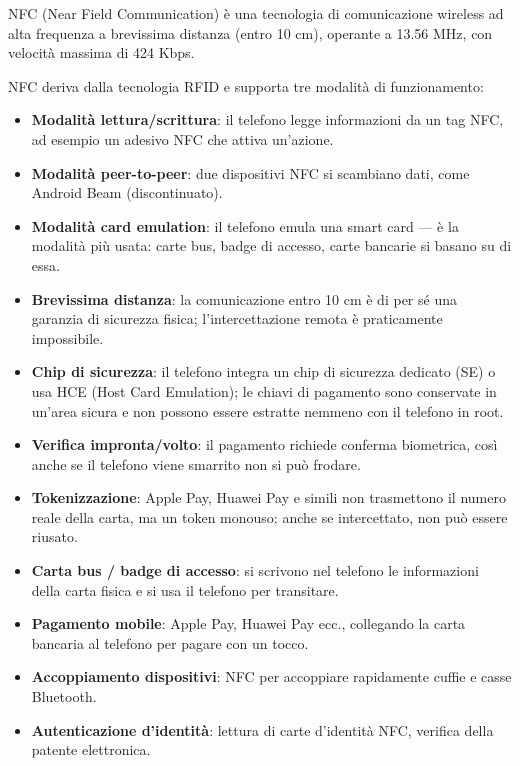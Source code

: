 
NFC (Near Field Communication) è una tecnologia di comunicazione wireless ad alta frequenza a brevissima distanza (entro 10 cm), operante a 13.56 MHz, con velocità massima di 424 Kbps.


NFC deriva dalla tecnologia RFID e supporta tre modalità di funzionamento:

\begin{itemize}
  \item \textbf{Modalità lettura/scrittura}: il telefono legge informazioni da un tag NFC, ad esempio un adesivo NFC che attiva un'azione.
  \item \textbf{Modalità peer-to-peer}: due dispositivi NFC si scambiano dati, come Android Beam (discontinuato).
  \item \textbf{Modalità card emulation}: il telefono emula una smart card — è la modalità più usata: carte bus, badge di accesso, carte bancarie si basano su di essa.
\end{itemize}


\begin{itemize}
  \item \textbf{Brevissima distanza}: la comunicazione entro 10 cm è di per sé una garanzia di sicurezza fisica; l'intercettazione remota è praticamente impossibile.
  \item \textbf{Chip di sicurezza}: il telefono integra un chip di sicurezza dedicato (SE) o usa HCE (Host Card Emulation); le chiavi di pagamento sono conservate in un'area sicura e non possono essere estratte nemmeno con il telefono in root.
  \item \textbf{Verifica impronta/volto}: il pagamento richiede conferma biometrica, così anche se il telefono viene smarrito non si può frodare.
  \item \textbf{Tokenizzazione}: Apple Pay, Huawei Pay e simili non trasmettono il numero reale della carta, ma un token monouso; anche se intercettato, non può essere riusato.
\end{itemize}


\begin{itemize}
  \item \textbf{Carta bus / badge di accesso}: si scrivono nel telefono le informazioni della carta fisica e si usa il telefono per transitare.
  \item \textbf{Pagamento mobile}: Apple Pay, Huawei Pay ecc., collegando la carta bancaria al telefono per pagare con un tocco.
  \item \textbf{Accoppiamento dispositivi}: NFC per accoppiare rapidamente cuffie e casse Bluetooth.
  \item \textbf{Autenticazione d'identità}: lettura di carte d'identità NFC, verifica della patente elettronica.
\end{itemize}

